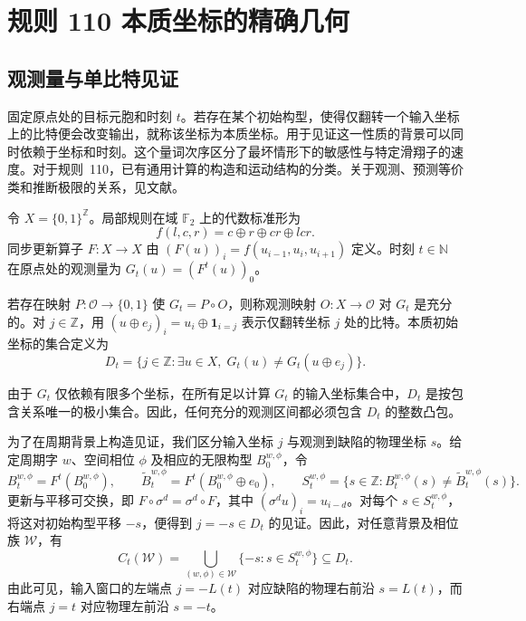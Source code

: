 \section{规则 110 本质坐标的精确几何}\label{sec:geometry}
\subsection{观测量与单比特见证}
固定原点处的目标元胞和时刻 $t$。若存在某个初始构型，使得仅翻转一个输入坐标上的比特便会改变输出，就称该坐标为本质坐标。用于见证这一性质的背景可以同时依赖于坐标和时刻。这个量词次序区分了最坏情形下的敏感性与特定滑翔子的速度。对于规则~110，已有通用计算的构造\cite{cook2004}和运动结构的分类\cite{wolfram1986,martinez2006}。关于观测、预测等价类和推断极限的关系，见文献\cite{shalizi2001,wolpert2008}。

\begin{definition}[规则 110 与观测量]
令 $X = \{0, 1\}^{\mathbb{Z}}$。局部规则在域 $\mathbb{F}_2$ 上的代数标准形为
\begin{equation}\label{eq:rule110}
f(l, c, r) = c \oplus r \oplus cr \oplus lcr.
\end{equation}
同步更新算子 $F : X \to X$ 由 $(F(u))_i = f(u_{i-1}, u_i, u_{i+1})$ 定义。时刻 $t \in \mathbb{N}$ 在原点处的观测量为 $G_t(u) = (F^t(u))_0$。
\end{definition}

\begin{definition}[预测映射的分解与本质变量]
若存在映射 $P : \mathcal{O} \to \{0, 1\}$ 使 $G_t = P \circ O$，则称观测映射 $O : X \to \mathcal{O}$ 对 $G_t$ 是充分的。对 $j \in \mathbb{Z}$，用 $(u \oplus e_j)_i = u_i \oplus \mathbf{1}_{i=j}$ 表示仅翻转坐标 $j$ 处的比特。本质初始坐标的集合定义为
\begin{equation}\label{eq:essential_set}
D_t = \{ j \in \mathbb{Z} : \exists u \in X,\; G_t(u) \ne G_t(u \oplus e_j) \}.
\end{equation}
\end{definition}

由于 $G_t$ 仅依赖有限多个坐标，在所有足以计算 $G_t$ 的输入坐标集合中，$D_t$ 是按包含关系唯一的极小集合。因此，任何充分的观测区间都必须包含 $D_t$ 的整数凸包。

为了在周期背景上构造见证，我们区分输入坐标 $j$ 与观测到缺陷的物理坐标 $s$。给定周期字 $w$、空间相位 $\phi$ 及相应的无限构型 $B_0^{w,\phi}$，令
\begin{equation}\label{eq:diff_support}
B_t^{w,\phi} = F^t(B_0^{w,\phi}), \qquad
\widetilde B_t^{w,\phi} = F^t(B_0^{w,\phi} \oplus e_0), \qquad
S_t^{w,\phi} = \{ s \in \mathbb{Z} : B_t^{w,\phi}(s) \ne \widetilde B_t^{w,\phi}(s) \}.
\end{equation}
更新与平移可交换，即 $F \circ \sigma^d = \sigma^d \circ F$，其中 $(\sigma^d u)_i = u_{i-d}$。对每个 $s \in S_t^{w,\phi}$，将这对初始构型平移 $-s$，便得到 $j = -s \in D_t$ 的见证。因此，对任意背景及相位族 $\mathcal{W}$，有
\begin{equation}\label{eq:coverage_bridge}
C_t(\mathcal{W}) = \bigcup_{(w,\phi) \in \mathcal{W}} \{ -s : s \in S_t^{w,\phi} \} \subseteq D_t.
\end{equation}
由此可见，输入窗口的左端点 $j = -L(t)$ 对应缺陷的物理右前沿 $s = L(t)$，而右端点 $j = t$ 对应物理左前沿 $s = -t$。

